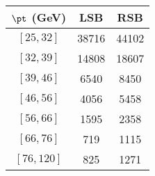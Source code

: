 \begin{tabular}{c||c|c}
$\pt$ (GeV) & LSB & RSB  \\
\hline
$[25, 32]$ & 38716 & 44102\\
$[32, 39]$ & 14808 & 18607\\
$[39, 46]$ & 6540 & 8450\\
$[46, 56]$ & 4056 & 5458\\
$[56, 66]$ & 1595 & 2358\\
$[66, 76]$ & 719 & 1115\\
$[76, 120]$ & 825 & 1271\\
\end{tabular}
